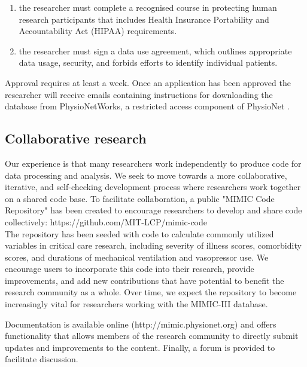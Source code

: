 \documentclass[english]{article}
\begin{document}
\begin{enumerate}
  \item the researcher must complete a recognised course in protecting human research participants that includes Health Insurance Portability and Accountability Act (HIPAA) requirements.
  \item the researcher must sign a data use agreement, which outlines appropriate data usage, security, and forbids efforts to identify individual patients.
\end{enumerate}

Approval requires at least a week. Once an application has been approved the researcher will receive emails containing instructions for downloading the database from PhysioNetWorks, a restricted access component of PhysioNet \cite{cite6}.

\subsection*{Collaborative research}

Our experience is that many researchers work independently to produce code for data processing and analysis. We seek to move towards a more collaborative, iterative, and self-checking development process where researchers work together on a shared code base. To facilitate collaboration, a public "MIMIC Code Repository" has been created to encourage researchers to develop and share code collectively: https://github.com/MIT-LCP/mimic-code \\

The repository has been seeded with code to calculate commonly utilized variables in critical care research, including severity of illness scores, comorbidity scores, and durations of mechanical ventilation and vasopressor use.
We encourage users to incorporate this code into their research, provide improvements, and add new contributions that have potential to benefit the research community as a whole. Over time, we expect the repository to become increasingly vital for researchers working with the MIMIC-III database.


Documentation is available online (http://mimic.physionet.org) and offers functionality that allows members of the research community to directly submit updates and improvements to the content. Finally, a forum is provided to facilitate discussion.
\end{document}
